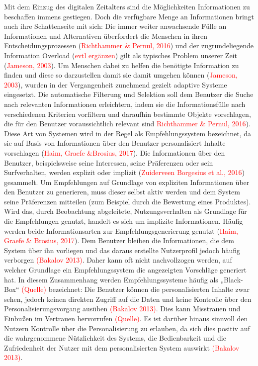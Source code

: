 \documentclass[ngerman, a4paper, abstract=false, twoside=false, parskip=half, DIV=12, bibtotoc]{scrartcl}
\begin{document}
Mit dem Einzug des digitalen Zeitalters sind die Möglichkeiten Informationen zu beschaffen immens gestiegen. Doch die verfügbare Menge an Informationen bringt auch ihre Schattenseite mit sich: Die immer weiter anwachsende Fülle an Informationen und Alternativen überfordert die Menschen in ihren Entscheidungsprozessen (\textcolor{red}{Richthammer & Pernul, 2016}) und der zugrundeliegende Information Overload (\textcolor{red}{evtl ergänzen})  gilt als typisches Problem unserer Zeit (\textcolor{red}{Jameson, 2003}). Um Menschen dabei zu helfen die benötigte Information zu finden und diese so darzustellen damit sie damit umgehen können (\textcolor{red}{Jameson, 2003}), wurden in der Vergangenheit zunehmend gezielt adaptive Systeme eingesetzt. Die automatische Filterung und Selektion soll dem Benutzer die Suche nach relevanten Informationen erleichtern, indem sie die Informationsfülle nach verschiedenen Kriterien vorfiltern und daraufhin bestimmte Objekte vorschlagen, die für den Benutzer voraussichtlich relevant sind \textcolor{red}{Richthammer & Pernul, 2016}). Diese Art von Systemen wird in der Regel als Empfehlungssystem bezeichnet, da sie auf Basis von Informationen über den Benutzer personalisiert Inhalte vorschlagen (\textcolor{red}{Haim, Graefe \&Brosius, 2017}). Die Informationen über den Benutzer, beispielsweise seine Interessen, seine Präferenzen oder sein Surfverhalten, werden explizit oder implizit (\textcolor{red}{Zuiderveen Borgesius et al., 2016}) gesammelt. Um Empfehlungen auf Grundlage von expliziten Informationen über den Benutzer zu generieren, muss dieser selbst aktiv werden und dem System seine Präferenzen mitteilen (zum Beispiel durch die Bewertung eines Produktes). Wird das, durch Beobachtung abgeleitete, Nutzungsverhalten als Grundlage für die Empfehlungen genutzt, handelt es sich um implizite Informationen. Häufig werden beide Informationsarten zur Empfehlungsgenerierung genutzt (\textcolor{red}{Haim, Graefe \& Brosius, 2017}). Dem Benutzer bleiben die Informationen, die dem System über ihn vorliegen und das daraus erstellte Nutzerprofil jedoch häufig verborgen \textcolor{red}{(Bakalov 2013)}. Daher kann oft nicht nachvollzogen werden, auf welcher Grundlage ein Empfehlungssystem die angezeigten Vorschläge generiert hat. In diesem Zusammenhang werden Empfehlungssysteme häufig als „Black-Box“ \textcolor{red}{(Quelle)} bezeichnet: Die Benutzer können die personalisierten Inhalte zwar sehen, jedoch keinen direkten Zugriff auf die Daten und keine Kontrolle über den Personalisierungsvorgang ausüben \textcolor{red}{(Bakalov 2013)}. Dies kann Misstrauen und Einbußen im Vertrauen hervorrufen \textcolor{red}{(Quelle)}. Es ist darüber hinaus sinnvoll den Nutzern Kontrolle über die Personalisierung zu erlauben, da sich dies positiv auf die wahrgenommene Nützlichkeit des Systems, die Bedienbarkeit und die Zufriedenheit der Nutzer mit dem personalisierten System auswirkt \textcolor{red}{(Bakalov 2013)}. 
\end{document}
